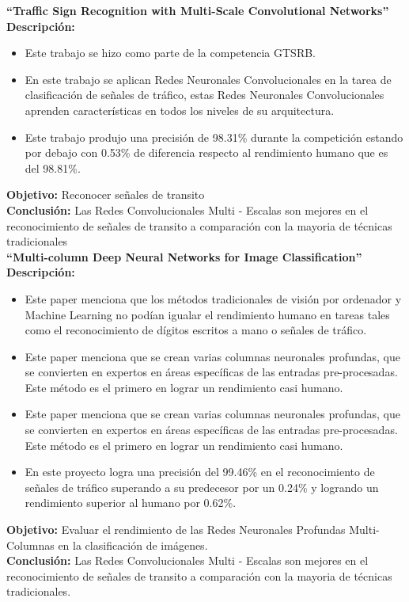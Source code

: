 \textbf{“Traffic Sign Recognition with Multi-Scale Convolutional Networks” \cite{12sermanet2011traffic}}\\
\textbf{Descripción:}\\

\begin{itemize}
\item Este trabajo se hizo como parte de la competencia GTSRB.
\item En este trabajo se aplican Redes Neuronales Convolucionales en la tarea de clasificación de señales de tráfico, estas Redes Neuronales Convolucionales aprenden características en todos los niveles de su arquitectura.
\item Este trabajo produjo una precisión de 98.31\% durante la competición estando por debajo con 0.53\% de diferencia respecto al rendimiento humano que es del 98.81\%.
\end{itemize}
\textbf{Objetivo:} Reconocer señales de transito\\
\textbf{Conclusión:} Las Redes Convolucionales Multi - Escalas son mejores en el reconocimiento de señales de transito a comparación con la mayoria de técnicas tradicionales\\




\textbf{“Multi-column Deep Neural Networks for Image Classification” \cite{4ciregan2012multi}}\\
\textbf{Descripción:}\\

\begin{itemize}
\item Este paper menciona que los métodos tradicionales de visión por ordenador y Machine Learning no podían igualar el rendimiento humano en tareas tales como el reconocimiento de dígitos escritos a mano o señales de tráfico. 
\item Este paper menciona que se crean varias columnas neuronales profundas, que se convierten en expertos en áreas específicas de las entradas pre-procesadas. Este método es el primero en lograr un rendimiento casi humano. 
\item Este paper menciona que se crean varias columnas neuronales profundas, que se convierten en expertos en áreas específicas de las entradas pre-procesadas. Este método es el primero en lograr un rendimiento casi humano. 
\item En este proyecto logra una precisión del 99.46\% en el reconocimiento de señales de tráfico superando a su predecesor por un 0.24\% y logrando un rendimiento superior al humano por 0.62\%.
\end{itemize}
\textbf{Objetivo:} Evaluar el rendimiento de las Redes Neuronales Profundas Multi-Columnas en la clasificación de imágenes.\\
\textbf{Conclusión:} Las Redes Convolucionales Multi - Escalas son mejores en el reconocimiento de señales de transito a comparación con la mayoria de técnicas tradicionales.\\


